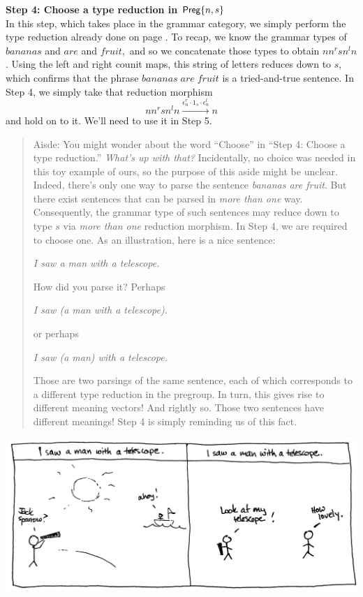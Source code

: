 \documentclass{tufte-handout-tai}
\newcommand{\cat}[1]{{\normalfont\textsf{#1}}}
\theoremstyle{plain}
\theoremstyle{definition}
\theoremstyle{remark}
\begin{document}
\vspace{0.4cm}

\noindent\textbf{\large Step 4: Choose a type reduction in $\cat{Preg}\{n,s\}$}\\[10pt]

\noindent In this step, which takes place in the grammar category, we simply perform the type reduction already done on page \pageref{pic:fruit}. To recap, we know the grammar types of $bananas$ and $are$ and $fruit,$ and so we concatenate those types to obtain $nn^rsn^ln$. Using the left and right counit maps, this string of letters reduces down to $s$, which confirms that the phrase $bananas\;are\;fruit$ is a tried-and-true sentence. In Step 4, we simply take that reduction morphism
\[nn^rsn^ln\overset{\epsilon_n^r\cdot 1_s\cdot \epsilon_n^l}{\longrightarrow} n\]
and hold on to it. We'll need to use it in Step 5.
\vspace{0.4cm}
	\begin{quote}
	Aisde: You might wonder about the word ``Choose'' in ``Step 4: Choose a type reduction.'' \textit{What's up with that?} Incidentally, no choice was needed in this toy example of ours, so the purpose of this aside might be unclear. Indeed, there's only one way to parse the sentence \textit{bananas are fruit}. But there exist sentences that can be parsed in \textit{more than one} way. Consequently, the grammar type of such sentences may reduce down to type $s$ via \textit{more than one} reduction morphism. In Step 4, we are required to choose one. As an illustration, here is a nice sentence:
	\begin{center}
	\textit{I saw a man with a telescope.}
	\end{center}
	How did you parse it? Perhaps
	\begin{center}
	\textit{I saw (a man with a telescope).}
	\end{center}
	or perhaps
	\begin{center}
	\textit{I saw (a man) with a telescope.}
	\end{center}
	Those are two parsings of the same sentence, each of which corresponds to a different type reduction in the pregroup. In turn, this gives rise to different meaning vectors! And rightly so. Those two sentences have different meanings! Step 4 is simply reminding us of this fact.
	\end{quote} \vspace{0.3cm}
	\begin{center}
	\includegraphics[width=!,totalheight=!,scale=0.15]{telescope.jpg}
	\end{center}
	
\end{document}
